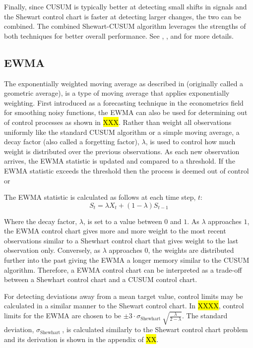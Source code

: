 Finally, since CUSUM is typically better at detecting small shifts in signals and the Shewart control chart is faster at detecting larger changes, the two can be combined. The combined Shewart-CUSUM algorithm leverages the strengths of both techniques for better overall performance. See \cite{lucas1982combined}, \cite{yashchin1985analysis}, and \cite{westgard1977combined} for more details. 

\subsection{EWMA}
The exponentially weighted moving average as described in \cite{roberts1959control} (originally called a geometric average), is a type of moving average that applies exponentially weighting. First introduced as a forecasting technique in the econometrics field for smoothing noisy functions, the EWMA can also be used for determining out of control processes as shown in \hl{XXX}. Rather than weight all observations uniformly like the standard CUSUM algorithm or a simple moving average, a decay factor (also called a  forgetting factor), $\lambda$, is used to control how much weight is distributed over the previous observations. As each new observation arrives, the EWMA statistic is updated and compared to a threshold. If the EWMA statistic exceeds the threshold then the process is deemed out of control or 

The EWMA statistic is calculated as follows at each time step, $t$:
$$S_t = \lambda X_t + (1-\lambda)S_{t-1} $$

Where the decay factor,  $\lambda$, is set to a value between $0$ and $1$. As $\lambda$ approaches $1$, the EWMA control chart gives more and more weight to the most recent observations similar to a Shewhart control chart that gives weight to the last observation only. Conversely, as $\lambda$ approaches $0$, the weights are distributed further into the past giving the EWMA a longer memory similar to the CUSUM algorithm. Therefore, a EWMA control chart can be interpreted as a trade-off between a Shewhart control chart and a CUSUM control chart. 

For detecting deviations away from a mean target value, control limits may be calculated in a similar manner to the Shewart control chart. In \hl{XXXX}, control limits for the EWMA are chosen to be  $\pm 3 \cdot \sigma_{\text {Shewhart }} \sqrt{\frac{\lambda}{2-\lambda}}$. The standard deviation, $\sigma_{\text {Shewhart }}$, is calculated similarly to the Shewart control chart problem and its derivation is shown in the appendix of \hl{XX}.

